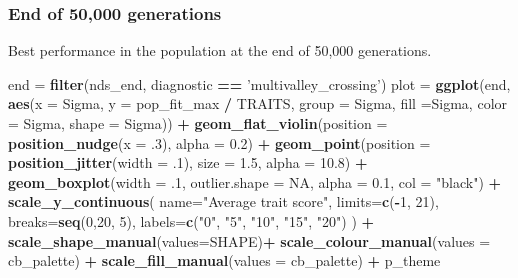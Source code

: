 \documentclass[]{book}
\newenvironment{Shaded}{\begin{snugshade}}{\end{snugshade}}
\newcommand{\DataTypeTok}[1]{\textcolor[rgb]{0.13,0.29,0.53}{#1}}
\newcommand{\DecValTok}[1]{\textcolor[rgb]{0.00,0.00,0.81}{#1}}
\newcommand{\FloatTok}[1]{\textcolor[rgb]{0.00,0.00,0.81}{#1}}
\newcommand{\KeywordTok}[1]{\textcolor[rgb]{0.13,0.29,0.53}{\textbf{#1}}}
\newcommand{\NormalTok}[1]{#1}
\newcommand{\OperatorTok}[1]{\textcolor[rgb]{0.81,0.36,0.00}{\textbf{#1}}}
\newcommand{\OtherTok}[1]{\textcolor[rgb]{0.56,0.35,0.01}{#1}}
\newcommand{\StringTok}[1]{\textcolor[rgb]{0.31,0.60,0.02}{#1}}
\begin{document}
\hypertarget{end-of-50000-generations-36}{%
\subsubsection{End of 50,000 generations}\label{end-of-50000-generations-36}}

Best performance in the population at the end of 50,000 generations.

\begin{Shaded}
\begin{Highlighting}[]
\NormalTok{end =}\StringTok{ }\KeywordTok{filter}\NormalTok{(nds_end, diagnostic }\OperatorTok{==}\StringTok{ 'multivalley_crossing'}\NormalTok{)}
\NormalTok{plot =}\StringTok{ }\KeywordTok{ggplot}\NormalTok{(end, }\KeywordTok{aes}\NormalTok{(}\DataTypeTok{x =}\NormalTok{ Sigma, }\DataTypeTok{y =}\NormalTok{ pop_fit_max }\OperatorTok{/}\StringTok{ }\NormalTok{TRAITS, }\DataTypeTok{group =}\NormalTok{ Sigma, }\DataTypeTok{fill =}\NormalTok{Sigma, }\DataTypeTok{color =}\NormalTok{ Sigma, }\DataTypeTok{shape =}\NormalTok{ Sigma)) }\OperatorTok{+}
\StringTok{  }\KeywordTok{geom_flat_violin}\NormalTok{(}\DataTypeTok{position =} \KeywordTok{position_nudge}\NormalTok{(}\DataTypeTok{x =} \FloatTok{.3}\NormalTok{), }\DataTypeTok{alpha =} \FloatTok{0.2}\NormalTok{) }\OperatorTok{+}
\StringTok{  }\KeywordTok{geom_point}\NormalTok{(}\DataTypeTok{position =} \KeywordTok{position_jitter}\NormalTok{(}\DataTypeTok{width =} \FloatTok{.1}\NormalTok{), }\DataTypeTok{size =} \FloatTok{1.5}\NormalTok{, }\DataTypeTok{alpha =} \FloatTok{10.8}\NormalTok{) }\OperatorTok{+}
\StringTok{  }\KeywordTok{geom_boxplot}\NormalTok{(}\DataTypeTok{width =} \FloatTok{.1}\NormalTok{, }\DataTypeTok{outlier.shape =} \OtherTok{NA}\NormalTok{, }\DataTypeTok{alpha =} \FloatTok{0.1}\NormalTok{, }\DataTypeTok{col =} \StringTok{"black"}\NormalTok{) }\OperatorTok{+}
\StringTok{  }\KeywordTok{scale_y_continuous}\NormalTok{(}
    \DataTypeTok{name=}\StringTok{"Average trait score"}\NormalTok{,}
    \DataTypeTok{limits=}\KeywordTok{c}\NormalTok{(}\OperatorTok{-}\DecValTok{1}\NormalTok{, }\DecValTok{21}\NormalTok{),}
    \DataTypeTok{breaks=}\KeywordTok{seq}\NormalTok{(}\DecValTok{0}\NormalTok{,}\DecValTok{20}\NormalTok{, }\DecValTok{5}\NormalTok{),}
    \DataTypeTok{labels=}\KeywordTok{c}\NormalTok{(}\StringTok{"0"}\NormalTok{, }\StringTok{"5"}\NormalTok{, }\StringTok{"10"}\NormalTok{, }\StringTok{"15"}\NormalTok{, }\StringTok{"20"}\NormalTok{)}
\NormalTok{  ) }\OperatorTok{+}
\StringTok{  }\KeywordTok{scale_shape_manual}\NormalTok{(}\DataTypeTok{values=}\NormalTok{SHAPE)}\OperatorTok{+}
\StringTok{  }\KeywordTok{scale_colour_manual}\NormalTok{(}\DataTypeTok{values =}\NormalTok{ cb_palette) }\OperatorTok{+}
\StringTok{  }\KeywordTok{scale_fill_manual}\NormalTok{(}\DataTypeTok{values =}\NormalTok{ cb_palette) }\OperatorTok{+}
\StringTok{  }\NormalTok{p_theme}


\end{Highlighting}
\end{Shaded}
\end{document}

